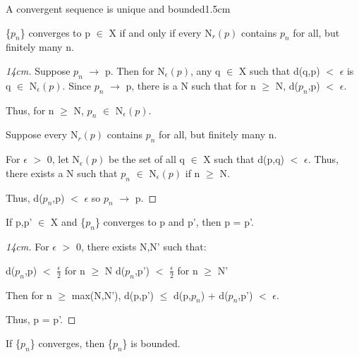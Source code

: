     \begin{ltheorem}{A convergent sequence is unique and bounded}{1.5cm}
        \item \{$p_n$\} converges to p $\in$ X if and only if
            every N$_r(p)$ contains $p_n$ for all, but finitely many n.

            \begin{proof}[14cm]
                Suppose $p_n$ $\rightarrow$ p.
                Then for N$_{\epsilon}(p)$, any q $\in$ X such that
                d(q,p) $<$ $\epsilon$ is q $\in$ N$_{\epsilon}(p)$.
                Since $p_n$ $\rightarrow$ p, there is a N such that for
                n $\geq$ N, d($p_n$,p) $<$ $\epsilon$.

                Thus, for n $\geq$ N, $p_n$ $\in$ N$_{\epsilon}(p)$.

                Suppose every N$_r(p)$ contains $p_n$ for all, but finitely
                many n.

                For $\epsilon$ $>$ 0, let N$_{\epsilon}(p)$ be the set of
                all q $\in$ X such that d(p,q) $<$ $\epsilon$.
                Thus, there exists a N such that $p_n$ $\in$ N$_{\epsilon}(p)$
                if n $\geq$ N.

                Thus, d($p_n$,p) $<$ $\epsilon$ so $p_n$ $\rightarrow$ p.
            \end{proof}

        \item If p,p' $\in$ X and \{$p_n$\} converges to p and p', then p = p'.

            \begin{proof}[14cm]
                For $\epsilon$ $>$ 0, there exists N,N' such that:

                \hspace{1cm}
                d($p_n$,p) $<$ $\frac{\epsilon}{2}$ for n $\geq$ N
                \hspace{1cm}
                d($p_n$,p') $<$ $\frac{\epsilon}{2}$ for n $\geq$ N'

                Then for n $\geq$ max(N,N'),
                d(p,p') $\leq$ d(p,$p_n$) + d($p_n$,p') $<$ $\epsilon$.

                Thus, p = p'.
            \end{proof}

            \newpage

        \item If \{$p_n$\} converges, then \{$p_n$\} is bounded.


\end{ltheorem}
